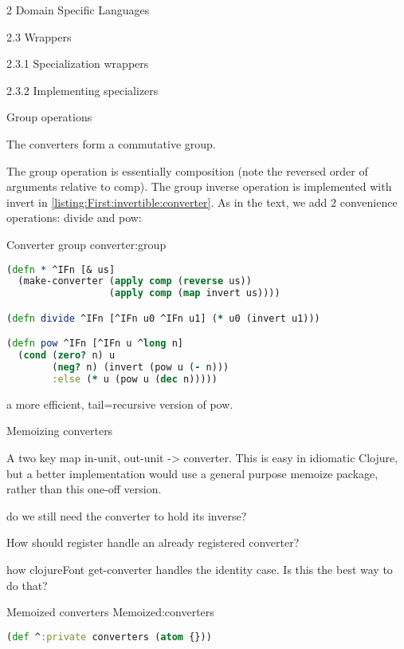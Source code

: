 \documentclass[12pt]{PalisadesLakesBook}
\begin{document}
\begin{plSection}{}
\begin{plSection}{2 Domain Specific Languages}
\begin{plSection}{2.3 Wrappers}
\begin{plSection}{2.3.1 Specialization wrappers}
\end{plSection}%
\begin{plSection}{2.3.2 Implementing specializers}
\begin{plSection}{Group operations}

The converters form a commutative group.

The group operation is essentially composition
(note the reversed order of arguments relative to 
{\clojureFont comp}).
The group inverse operation is 
implemented with {\clojureFont invert}
in \cref{listing:First:invertible:converter}.
As in the text, we add 2 convenience operations:
{\clojureFont divide} and {\clojureFont pow}:
\begin{plListing}
{Converter group}
{converter:group}
\begin{lstlisting}[language=clojure]
(defn * ^IFn [& us]
  (make-converter (apply comp (reverse us))
                  (apply comp (map invert us))))

(defn divide ^IFn [^IFn u0 ^IFn u1] (* u0 (invert u1)))

(defn pow ^IFn [^IFn u ^long n]
  (cond (zero? n) u
        (neg? n) (invert (pow u (- n)))
        :else (* u (pow u (dec n)))))
\end{lstlisting}
\end{plListing}
\TODO a more efficient, tail=recursive version 
of {\clojureFont pow}.

\end{plSection}%
\begin{plSection}{Memoizing converters}

A two key map in-unit, out-unit -> converter.
This is easy in idiomatic Clojure,
but a better implementation would use a general purpose
memoize package, rather than this one-off version.

\TODO do we still need the converter to hold its inverse?

\TODO How should {\clojureFont register} handle an already
registered converter?

\NOTE how {clojureFont get-converter} handles the identity case.
Is this the best way to do that?

\begin{plListing}
{Memoized converters}
{Memoized:converters}
\begin{lstlisting}[language=clojure]
(def ^:private converters (atom {}))


\end{lstlisting}
\end{plListing}
\end{plSection}
\end{plSection}
\end{plSection}
\end{plSection}
\end{plSection}
\end{document}
